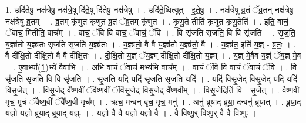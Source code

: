 \documentclass[17pt]{extarticle}
\begin{document}
1. उदि॑तेषु॒ नक्ष॑त्रेषु॒ नक्ष॑त्रे॒षू दि॑ते॒षू दि॑तेषु॒ नक्ष॑त्रेषु । . उदि॑ते॒ष्वित्युत् - इ॒ते॒षु॒ । . नक्ष॑त्रेषु व्र॒तं ॅव्र॒तन् नक्ष॑त्रेषु॒ नक्ष॑त्रेषु व्र॒तम् । . व्र॒तम् कृ॑णुत कृणुत व्र॒तं ॅव्र॒तम् कृ॑णुत । . कृ॒णु॒ते तीति॑ कृणुत कृणु॒तेति॑ । . इति॒ वाचं॒ ॅवाच॒ मितीति॒ वाच᳚म् । . वाचं॒ ॅवि वि वाचं॒ ॅवाचं॒ ॅवि । . वि सृ॑जति सृजति॒ वि वि सृ॑जति । . सृ॒ज॒ति॒ य॒ज्ञ्व्र॑तो य॒ज्ञ्व्र॑तः सृजति सृजति य॒ज्ञ्व्र॑तः । . य॒ज्ञ्व्र॑तो॒ वै वै य॒ज्ञ्व्र॑तो य॒ज्ञ्व्र॑तो॒ वै । . य॒ज्ञ्व्र॑त॒ इति॑ य॒ज्ञ् - व्र॒तः॒ । . वै दी᳚क्षि॒तो दी᳚क्षि॒तो वै वै दी᳚क्षि॒तः । . दी॒क्षि॒तो य॒ज्ञ्ं ॅय॒ज्ञ्म् दी᳚क्षि॒तो दी᳚क्षि॒तो य॒ज्ञ्म् । . य॒ज्ञ् मे॒वैव य॒ज्ञ्ं ॅय॒ज्ञ् मे॒व । . ए॒वाभ्या᳚(1॒)भ्ये॑ वैवाभि । . अ॒भि वाचं॒ ॅवाच॑ म॒भ्य॑भि वाच᳚म् । . वाचं॒ ॅवि वि वाचं॒ ॅवाचं॒ ॅवि । . वि सृ॑जति सृजति॒ वि वि सृ॑जति । . सृ॒ज॒ति॒ यदि॒ यदि॑ सृजति सृजति॒ यदि॑ । . यदि॑ विसृ॒जेद् वि॑सृ॒जेद् यदि॒ यदि॑ विसृ॒जेत् । . वि॒सृ॒जेद् वै᳚ष्ण॒वीं ॅवै᳚ष्ण॒वीं ॅवि॑सृ॒जेद् वि॑सृ॒जेद् वै᳚ष्ण॒वीम् । . वि॒सृ॒जेदिति॑ वि - सृ॒जेत् । . वै॒ष्ण॒वी मृच॒ मृचं॑ ॅवैष्ण॒वीं ॅवै᳚ष्ण॒वी मृच᳚म् । . ऋच॒ मन्वन् वृच॒ मृच॒ मनु॑ । . अनु॑ ब्रूयाद् ब्रूया॒ दन्वनु॑ ब्रूयात् । . ब्रू॒या॒द् य॒ज्ञो य॒ज्ञो ब्रू॑याद् ब्रूयाद् य॒ज्ञ्ः । . य॒ज्ञो वै वै य॒ज्ञो य॒ज्ञो वै । . वै विष्णु॒र् विष्णु॒र् वै वै विष्णुः॑ । \newline
\end{document}
